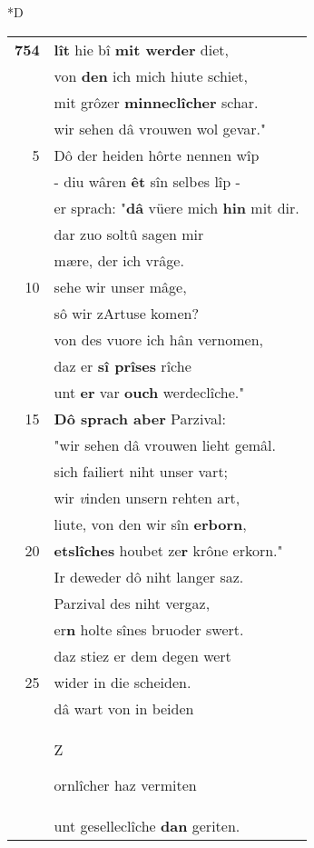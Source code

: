 \documentclass[8pt,a4paper,notitlepage]{article}
\begin{document}
\begin{table}[ht]
\begin{minipage}[t]{0.5\linewidth}
\small
\begin{center}*D
\end{center}
\begin{tabular}{rl}
\textbf{754} & \textbf{lît} hie bî \textbf{mit werder} diet,\\ 
 & von \textbf{den} ich mich hiute schiet,\\ 
 & mit grôzer \textbf{minneclîcher} schar.\\ 
 & wir sehen dâ vrouwen wol gevar."\\ 
5 & Dô der heiden hôrte nennen wîp\\ 
 & - diu wâren \textbf{êt} sîn selbes lîp -\\ 
 & er sprach: "\textbf{dâ} vüere mich \textbf{hin} mit dir.\\ 
 & dar zuo soltû sagen mir\\ 
 & mære, der ich vrâge.\\ 
10 & sehe wir unser mâge,\\ 
 & sô wir zArtuse komen?\\ 
 & von des vuore ich hân vernomen,\\ 
 & daz er \textbf{sî prîses} rîche\\ 
 & unt \textbf{er} var \textbf{ouch} werdeclîche."\\ 
15 & \textbf{Dô sprach aber} Parzival:\\ 
 & "wir sehen dâ vrouwen lieht gemâl.\\ 
 & sich failiert niht unser vart;\\ 
 & wir \textit{v}inden unsern rehten art,\\ 
 & liute, von den wir sîn \textbf{erborn},\\ 
20 & \textbf{etslîches} houbet ze\textbf{r} krône erkorn."\\ 
 & Ir deweder dô niht langer saz.\\ 
 & Parzival des niht vergaz,\\ 
 & er\textbf{n} holte sînes bruoder swert.\\ 
 & daz stiez er dem degen wert\\ 
25 & wider in die scheiden.\\ 
 & dâ wart von in beiden\\ 
 & \begin{large}Z\end{large}ornlîcher haz vermiten\\ 
 & unt geselleclîche \textbf{dan} geriten.\\ 

\end{tabular}
\end{minipage}
\end{table}
\end{document}

